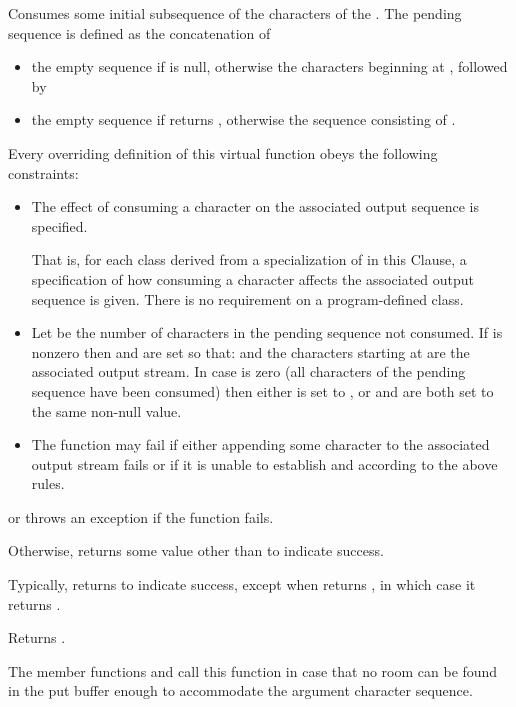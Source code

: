 \begin{itemdescr}  %
\pnum
\effects
Consumes some initial subsequence of the characters of the
.
The pending sequence is defined as the concatenation of
\begin{itemize}
\item
the empty sequence if  is null, otherwise the
characters beginning at
, followed by
\item
the empty sequence
if
returns
, otherwise the sequence consisting of .
\end{itemize}

\pnum
\expects
Every overriding definition of this virtual function
obeys the following constraints:
\begin{itemize}
\item
The effect of consuming a character on the associated output sequence is
specified.
\begin{footnote}
That is, for each class derived from a specialization of
in this Clause,
a specification of how consuming a character affects the associated output sequence is given.
There is no requirement on a program-defined class.
\end{footnote}
\item
Let
be the number of characters in the pending sequence not consumed.
If
is nonzero then
and
are set so that:
and the  characters starting at
are the associated output stream.
In case   is zero (all characters of the pending sequence have been consumed)
then either
is set to
,
or
and
are both set to the same non-null value.
\item
The function may fail if either
appending some character to the associated output stream fails or
if it is unable to establish
and
according to the above rules.
\end{itemize}

\pnum
\returns
{}
or throws an exception
if the function fails.

Otherwise,
returns some value other than
to indicate success.
\begin{footnote}
Typically,
returns  to indicate success, except when
returns
,
in which case it returns
.
\end{footnote}

\pnum
{}
Returns
.

\pnum
\remarks
The member functions
and
call this function in case that
no room can be found in the put buffer enough to accommodate the
argument character sequence.
\end{itemdescr}

